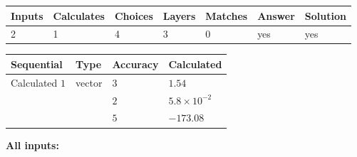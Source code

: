 \documentclass[12pt]{article}
\begin{document}
 
 
\noindent{}
 
 

 
 
\vspace{0.3in}
   
   
   
   
\noindent\begin{tabular}{|l|l|l|l|l|l|l|}
 \hline
Inputs & Calculates & Choices & Layers & Matches & Answer & Solution \\ \hline
           2  & 
           1  & 
           4
  & 
           3  & 
           0  & 
  yes & 
  yes 
  \\ \hline
 \end{tabular}
   
   
   
   
\noindent{}
   
   
  
  
\noindent\begin{tabular}{|l|l|l|l|}
\hline
 Sequential & Type & Accuracy & Calculated \\ 
\hline
 
 
  Calculated $            1 $ & vector &  
  $            3  $ 
 &  $ 1.54 $ 
 \\    
  & & 
  $            2  $ 
 &  $ 5.8 \times 10^{-2} $ 
 \\    
  & & 
  $            5  $ 
 &  $ -173.08 $ 
 \\  \hline  
 \end{tabular}
   
   
   
   
\noindent\vspace{0.1in}\hspace{-0.08in} {\textbf{\Large{All inputs: }}}
   
   
  
\end{document}
